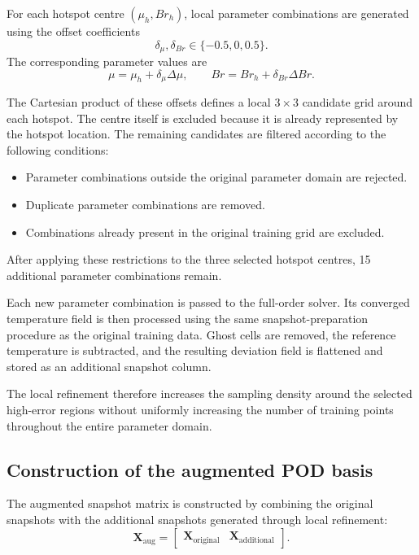 For each hotspot centre $(\mu_h,Br_h)$, local
parameter combinations are generated using the
offset coefficients
\[
\delta_\mu,\delta_{Br}
\in\{-0.5,0,0.5\}.
\]
The corresponding parameter values are
\begin{equation}
    \mu
    =
    \mu_h+\delta_\mu\Delta\mu,
    \qquad
    Br
    =
    Br_h+\delta_{Br}\Delta Br.
    \label{eq:local_parameter_refinement}
\end{equation}

The Cartesian product of these offsets defines a
local $3\times3$ candidate grid around each hotspot.
The centre itself is excluded because it is already
represented by the hotspot location. The remaining
candidates are filtered according to the following
conditions:
\begin{itemize}
    \item Parameter combinations outside the original
    parameter domain are rejected.
    \item Duplicate parameter combinations are removed.
    \item Combinations already present in the original
    training grid are excluded.
\end{itemize}

After applying these restrictions to the three
selected hotspot centres, 15 additional parameter
combinations remain.

Each new parameter combination is passed to the
full-order solver. Its converged temperature field
is then processed using the same snapshot-preparation
procedure as the original training data. Ghost cells
are removed, the reference temperature is subtracted,
and the resulting deviation field is flattened and
stored as an additional snapshot column.

The local refinement therefore increases the
sampling density around the selected high-error
regions without uniformly increasing the number
of training points throughout the entire parameter
domain.

\subsection{Construction of the augmented POD basis}

The augmented snapshot matrix is constructed by
combining the original snapshots with the additional
snapshots generated through local refinement:
\begin{equation}
    \boxed{
    \mathbf{X}_{\mathrm{aug}}
    =
    \begin{bmatrix}
    \mathbf{X}_{\mathrm{original}}
    &
    \mathbf{X}_{\mathrm{additional}}
    \end{bmatrix}.
    }
    \label{eq:augmented_snapshot_matrix}
\end{equation}

